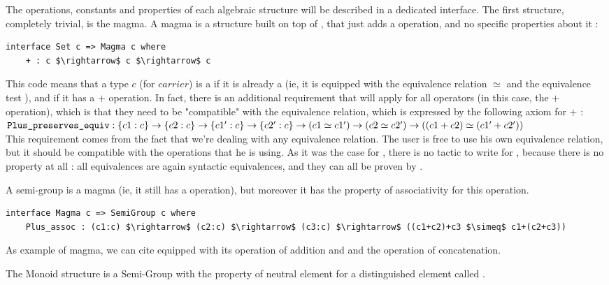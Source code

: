 The operations, constants and properties of each algebraic structure will be described in a dedicated interface. The first structure, completely trivial, is the magma. A magma is a structure built on top of , that just adds a  operation, and no specific properties about it :

\begin{lstlisting}
interface Set c => Magma c where
    + : c $\rightarrow$ c $\rightarrow$ c
\end{lstlisting}

This code means that a type $c$ (for $carrier$) is a  if it is already a  (ie, it is equipped with the equivalence relation $\simeq$ and the equivalence test ), and if it has a $+$ operation.
In fact, there is an additional requirement that will apply for all operators (in this case, the $+$ operation), which is that they need to be "compatible" with the equivalence relation, which is expressed by the following axiom for $+$ : \\ ${\mbox{\texttt{Plus\_preserves\_equiv}}} : \{c1:c\} \rightarrow \{c2:c\} \rightarrow \{c1':c\} \rightarrow \{c2':c\} \rightarrow (c1 \simeq c1') \rightarrow (c2 \simeq c2') \rightarrow ((c1+c2) \simeq (c1'+c2'))$ \\ 
This requirement comes from the fact that we're dealing with any equivalence relation. The user is free to use his own equivalence relation, but it should be compatible with the operations that he is using.
As it was the case for , there is no tactic to write for , because there is no property at all : all equivalences are again syntactic equivalences, and they can all be proven by . 

A semi-group is a magma (ie, it still has a  operation), but moreover it has the property of associativity for this operation. 

\begin{lstlisting}
interface Magma c => SemiGroup c where
    Plus_assoc : (c1:c) $\rightarrow$ (c2:c) $\rightarrow$ (c3:c) $\rightarrow$ ((c1+c2)+c3 $\simeq$ c1+(c2+c3))
\end{lstlisting}

As example of magma, we can cite  equipped with its operation of addition and  and the operation of concatenation.

The Monoid structure is a Semi-Group with the property of neutral element for a distinguished element called .

